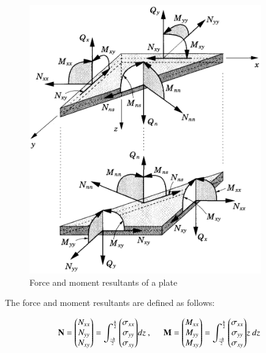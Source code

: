 \begin{figure}[h!]
	\centering
	\includegraphics[width=10cm]{images/composite_force_resultants}
	\caption{Force and moment resultants of a plate \cite{reddy2004mechanics}}
	\label{fig:compositeforceresultants}
\end{figure}

The force and moment resultants are defined as follows:

\begin{equation} 
\mathbf{N} = 
\begin{pmatrix}
N_{xx} \\
N_{yy} \\
N_{xy} 
\end{pmatrix}
=
{\int_{\frac{-h}{2}}^{\frac{h}{2}}
\begin{pmatrix}
\sigma_{xx} \\
\sigma_{yy} \\
\sigma_{xy} 
\end{pmatrix}}
dz\ ,
\hspace{5mm}
\mathbf{M} = 
\begin{pmatrix}
M_{xx} \\
M_{yy} \\
M_{xy} 
\end{pmatrix}
=
{\int_{\frac{-h}{2}}^{\frac{h}{2}}
	\begin{pmatrix}
	\sigma_{xx} \\
	\sigma_{yy} \\
	\sigma_{xy} 
	\end{pmatrix}}z\ 
dz
\label{eqscomp_force_resultants}
\end{equation}

